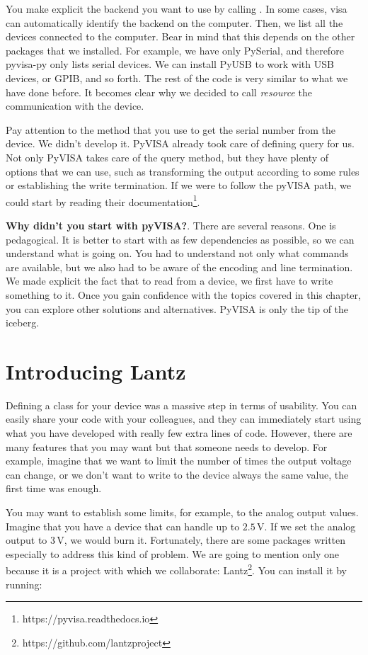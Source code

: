 \sloppy You make explicit the backend you want to use by calling . In some cases, visa can automatically identify the backend on the computer. Then, we list all the devices connected to the computer. Bear in mind that this depends on the other packages that we installed. For example, we have only PySerial, and therefore pyvisa-py only lists serial devices. We can install PyUSB to work with USB devices, or GPIB, and so forth. The rest of the code is very similar to what we have done before. It becomes clear why we decided to call \emph{resource} the communication with the device.

Pay attention to the  method that you use to get the serial number from the device. We didn't develop it. PyVISA already took care of defining query for us. Not only PyVISA takes care of the query method, but they have plenty of options that we can use, such as transforming the output according to some rules or establishing the write termination. If we were to follow the pyVISA path, we could start by reading their documentation\footnote{https://pyvisa.readthedocs.io}.

\textbf{Why didn't you start with pyVISA?}. There are several reasons. One is pedagogical. It is better to start with as few dependencies as possible, so we can understand what is going on. You had to understand not only what commands are available, but we also had to be aware of the encoding and line termination. We made explicit the fact that to read from a device, we first have to write something to it. Once you gain confidence with the topics covered in this chapter, you can explore other solutions and alternatives. PyVISA is only the tip of the iceberg.

\section{Introducing Lantz}\label{sec:lantz}
Defining a class for your device was a massive step in terms of usability. You can easily share your code with your colleagues, and they can immediately start using what you have developed with really few extra lines of code. However, there are many features that you may want but that someone needs to develop. For example, imagine that we want to limit the number of times the output voltage can change, or we don't want to write to the device always the same value, the first time was enough.

You may want to establish some limits, for example, to the analog output values. Imagine that you have a device that can handle up to $2.5\,\textrm{V}$. If we set the analog output to $3\,\textrm{V}$, we would burn it. Fortunately, there are some packages written especially to address this kind of problem. We are going to mention only one because it is a project with which we collaborate: Lantz\footnote{https://github.com/lantzproject}. You can install it by running:


